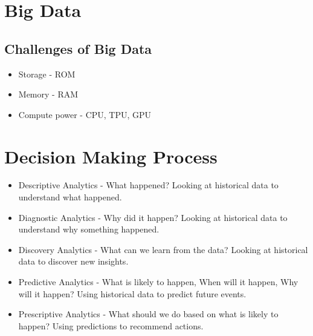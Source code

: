 \documentclass[12pt letter]{report}
\begin{document}
\section{Big Data}

\subsection{Challenges of Big Data}
\begin{itemize}
  \item Storage - ROM
  \item Memory - RAM
  \item Compute power - CPU, TPU, GPU
\end{itemize}

\section{Decision Making Process}

\begin{itemize}
  \item Descriptive Analytics  - What happened? Looking at historical data to understand what happened.
  \item Diagnostic Analytics - Why did it happen? Looking at historical data to understand why something happened.
  \item Discovery Analytics - What can we learn from the data? Looking at historical data to discover new insights.
  \item Predictive Analytics - What is likely to happen, When will it happen, Why will it happen? Using historical data to predict future events.
  \item Prescriptive Analytics - What should we do based on what is likely to happen? Using predictions  to recommend actions.
\end{itemize}
\end{document}
